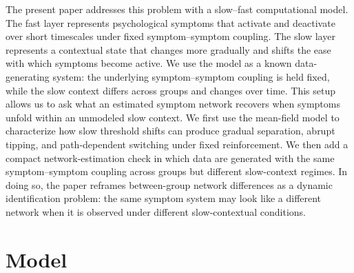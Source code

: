 \documentclass[man,12pt,floatsintext]{apa7}
\begin{document}
The present paper addresses this problem with a slow--fast computational model. The fast layer represents psychological symptoms that activate and deactivate over short timescales under fixed symptom--symptom coupling. The slow layer represents a contextual state that changes more gradually and shifts the ease with which symptoms become active. We use the model as a known data-generating system: the underlying symptom--symptom coupling is held fixed, while the slow context differs across groups and changes over time.
This setup allows us to ask what an estimated symptom network recovers when symptoms unfold within an unmodeled slow context. We first use the mean-field model to characterize how slow threshold shifts can produce gradual separation, abrupt tipping, and path-dependent switching under fixed reinforcement. We then add a compact network-estimation check in which data are generated with the same symptom--symptom coupling across groups but different slow-context regimes. In doing so, the paper reframes between-group network differences as a dynamic identification problem: the same symptom system may look like a different network when it is observed under different slow-contextual conditions.
\section{Model}\label{sec:model}
\end{document}
